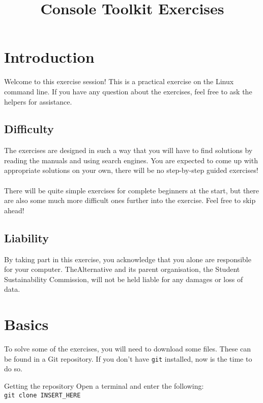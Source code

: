 \documentclass{TheAlternativeCourse}
\title{Console Toolkit Exercises}
\date{}
\begin{document}
\maketitle

\section{Introduction}

Welcome to this exercise session! This is a practical exercise on the Linux
command line.  If you have any question about the exercises, feel free to ask
the helpers for assistance.


\subsection*{Difficulty}

The exercises are designed in such a way that you will have to find solutions
by reading the manuals and using search engines. You are expected to come up
with appropriate solutions on your own, there will be no step-by-step guided
exercises! \\\\
%
There will be quite simple exercises for complete beginners at the start,
but there are also some much more difficult ones further into the exercise.
Feel free to skip ahead!

\subsection*{Liability}

By taking part in this exercise, you acknowledge that you alone are responsible
for your computer. TheAlternative and its parent organisation, the Student
Sustainability Commission, will not be held liable for any damages or loss of
data.

\pagebreak

\section{Basics}

To solve some of the exercises, you will need to download some files. These
can be found in a Git repository. If you don't have \texttt{git} installed,
now is the time to do so. \\
%
\begin{exercisebox}{Getting the repository}
    Open a terminal and enter the following: \\
    \texttt{git clone INSERT\_HERE}
\end{exercisebox}
\end{document}
